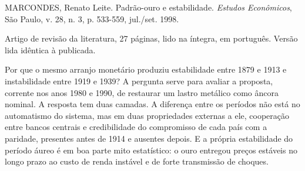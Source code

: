 
\begin{identificacao}
MARCONDES, Renato Leite. Padrão-ouro e estabilidade. \textit{Estudos Econômicos},
São Paulo, v. 28, n. 3, p. 533-559, jul./set. 1998.

Artigo de revisão da literatura, 27 páginas, lido na íntegra, em português.
Versão lida idêntica à publicada.
\end{identificacao}

Por que o mesmo arranjo monetário produziu estabilidade entre 1879 e 1913 e
instabilidade entre 1919 e 1939? A pergunta serve para avaliar a proposta,
corrente nos anos 1980 e 1990, de restaurar um lastro metálico como âncora
nominal. A resposta tem duas camadas. A diferença entre os períodos não está no
automatismo do sistema, mas em duas propriedades externas a ele, cooperação entre
bancos centrais e credibilidade do compromisso de cada país com a paridade,
presentes antes de 1914 e ausentes depois. E a própria estabilidade do período
áureo é em boa parte mito estatístico: o ouro entregou preços estáveis no longo
prazo ao custo de renda instável e de forte transmissão de choques.

